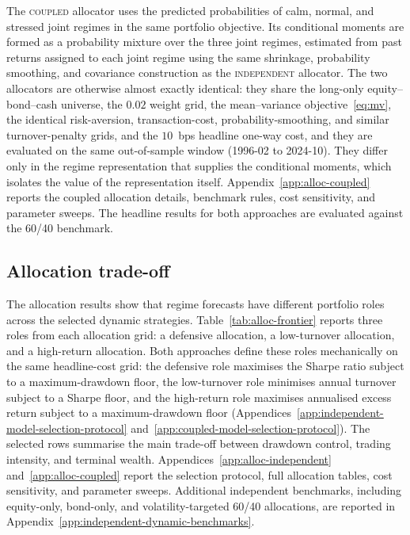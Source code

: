 \documentclass[10pt]{article}
\newcommand{\Acoup}{\textsc{coupled}}
\newcommand{\Bindep}{\textsc{independent}}
\begin{document}
The \Acoup{} allocator uses the predicted probabilities of calm, normal, and stressed joint
regimes in the same portfolio objective. Its conditional moments are formed as a probability
mixture over the three joint regimes, estimated from past returns assigned to each joint
regime using the same shrinkage, probability smoothing, and covariance construction as the
\Bindep{} allocator. The two allocators are otherwise almost exactly identical: they share the long-only
equity--bond--cash universe, the $0.02$ weight grid, the mean--variance objective~\eqref{eq:mv},
the identical risk-aversion, transaction-cost, probability-smoothing, and similar turnover-penalty grids, and
the $10$~bps headline one-way cost, and they are evaluated on the same out-of-sample window
(1996-02 to 2024-10). They differ only in the regime representation that supplies the
conditional moments, which isolates the value of the representation itself.
Appendix~\ref{app:alloc-coupled} reports the coupled allocation details,
benchmark rules, cost sensitivity, and parameter sweeps. The headline results for both
approaches are evaluated against the 60/40 benchmark.

\subsection{Allocation trade-off}
\label{sec:alloc-results}
\label{subsec:results-dynamic-allocation}

The allocation results show that regime forecasts have different portfolio roles across the
selected dynamic strategies. Table~\ref{tab:alloc-frontier} reports three roles from each
allocation grid: a defensive allocation, a low-turnover allocation, and a high-return
allocation. Both approaches define these roles mechanically on the same headline-cost
grid: the defensive role maximises the Sharpe ratio subject to a maximum-drawdown floor, the
low-turnover role minimises annual turnover subject to a Sharpe floor, and the high-return
role maximises annualised excess return subject to a maximum-drawdown floor
(Appendices~\ref{app:independent-model-selection-protocol}
and~\ref{app:coupled-model-selection-protocol}). The selected rows summarise the main
trade-off between drawdown control, trading intensity, and terminal wealth.
Appendices~\ref{app:alloc-independent} and~\ref{app:alloc-coupled} report the selection
protocol, full allocation tables, cost sensitivity, and parameter sweeps. Additional
independent benchmarks, including equity-only, bond-only, and volatility-targeted 60/40
allocations, are reported in Appendix~\ref{app:independent-dynamic-benchmarks}.
\end{document}

